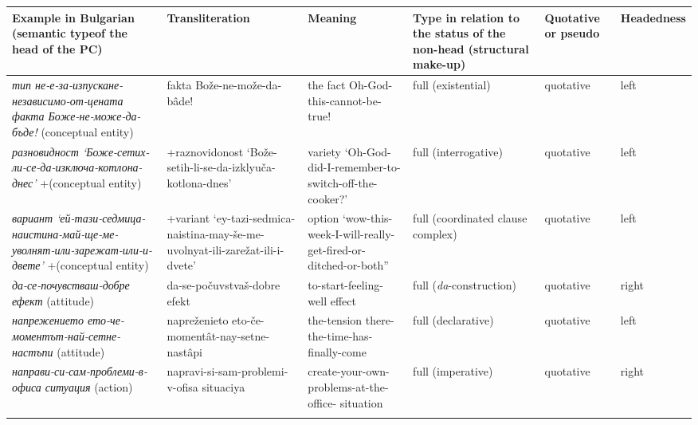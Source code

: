 \documentclass[output=paper]{LSP/langsci}
\begin{document}
\begin{sidewaystable}
\footnotesize
\begin{tabularx}{\textwidth}{QQQQp{1.5cm}l}
\lsptoprule
\textbf{Example in Bulgarian}\footnotemark[4]
\newline 
\textbf{(semantic type}\footnotemark[5] \textbf{of the head of the PC)} & \textbf{Transliteration} & \textbf{Meaning} & \textbf{Type in relation to the  status of the non-head (structural make-up)} & \textbf{Quotative or pseudo} & \textbf{Headedness}\\
\midrule
\textit{{тип не-е-за-изпускане-независимо-от-цената}}
\newline 
\textit{{факта Боже-не-може-да-бъде!}}
\newline 
(conceptual entity) & fakta Bože-ne-može-da-bâde! & the fact Oh-God-this-cannot-be- true! & full 
\newline 
(existential) & quotative & left\\
\textit{{разновидност ‘Боже-сетих-ли-се-да-изключа-котлона-днес’}}
\newline 
+(conceptual entity) & +raznovidonost ‘Bože-setih-li-se-da-izklyuča-kotlona-dnes’ & variety ‘Oh-God-did-I-remember-to-switch-off-the-cooker?’ & full 
\newline 
(interrogative) & quotative & left\\
\textit{{вариант ‘ей-тази-седмица-наистина-май-ще-ме-уволнят-или-зарежат-или-и-двете’}}
\newline 
+(conceptual entity) & +variant ‘ey-tazi-sedmica-naistina-may-še-me-uvolnyat-ili-zarežat-ili-i-dvete’ & option ‘wow-this-week-I-will-really-get-fired-or-ditched-or-both” & full 
\newline 
(coordinated clause complex) & quotative & left\\
\textit{{да-се-почувстваш-добре} {ефект}}
\newline 
(attitude) & da-se-počuvstvaš-dobre efekt & to-start-feeling-well effect & full 
\newline 
(\textit{da}-construction) & quotative & right\\
\textit{{напрежението ето-че-моментът-най-сетне-настъпи}}
\newline 
(attitude) & napreženieto eto-če-momentât-nay-setne-nastâpi & the-tension there-the-time-has-finally-come & full 
\newline 
(declarative) & quotative & left\\
\textit{{направи-си-сам-проблеми-в-офиса ситуация}}
\newline 
(action) & napravi-si-sam-problemi-v-ofisa situaciya & create-your-own-problems-at-the-office- situation & full 
\newline 
(imperative) & quotative & right\\

\lspbottomrule
\end{tabularx}
\end{sidewaystable}
\end{document}
